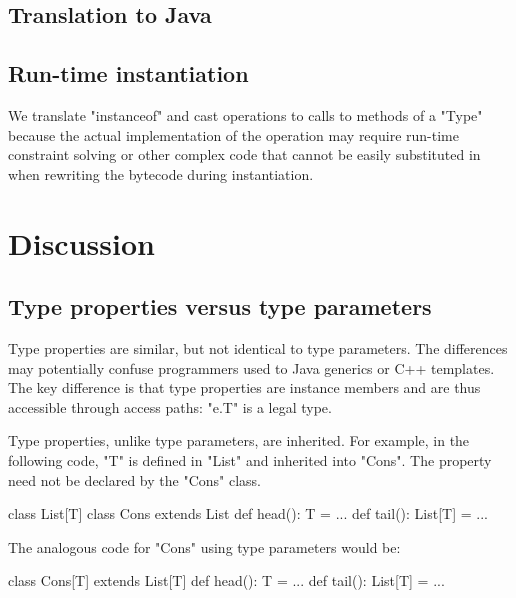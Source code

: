 \documentclass[preprint,nocopyrightspace,9pt]{sigplanconf}
\begin{document}
\subsection{Translation to Java}

\subsection{Run-time instantiation}

We translate \xcd"instanceof" and cast operations to calls to
methods of a \xcd"Type" because the actual implementation of
the operation may require run-time constraint solving or other
complex code that cannot be easily substituted in when rewriting
the bytecode during instantiation.

\section{Discussion}
\label{sec:discussion}


\subsection{Type properties versus type parameters}


Type properties are similar, but not identical to type parameters.  The
differences may potentially confuse programmers used to Java generics or C++
templates.  The key difference is that type properties are instance members and
are thus accessible through access paths: \xcd"e.T" is a legal type.

Type properties, unlike type parameters, are inherited.
For example, in the following code, \xcd"T" is defined in \xcd"List"
and inherited into \xcd"Cons".  The property need not be
declared by the \xcd"Cons" class.
\begin{xten}
class List[T] { }
class Cons extends List {
    def head(): T = { ... }
    def tail(): List[T] = { ... }
}
\end{xten}
The analogous code for \xcd"Cons" using type parameters would be:
\begin{xten}
class Cons[T] extends List[T] {
    def head(): T = { ... }
    def tail(): List[T] = { ... }
}
\end{xten}
\end{document}
